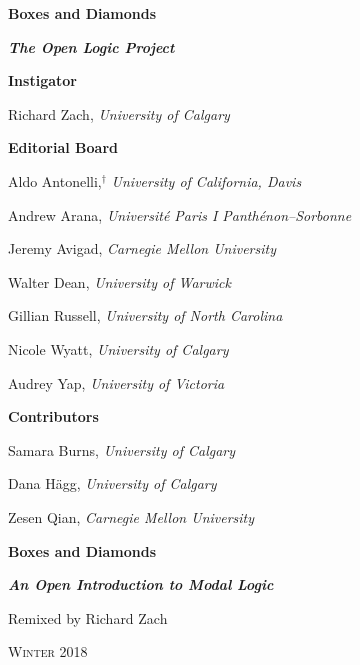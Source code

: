 

\pagestyle{empty}

\vspace*{100pt}

\begin{raggedleft}

{\fontsize{24pt}{24pt}\selectfont\bfseries\sffamily%
Boxes and Diamonds}

\end{raggedleft}


\newpage


\vspace*{100pt}

{\bfseries\itshape The Open Logic Project}

\bigskip

\textbf{\color{leadbeater}Instigator}

\medskip

Richard Zach, \emph{University of Calgary}

\bigskip

\textbf{\color{leadbeater}Editorial Board}

\medskip

Aldo Antonelli,$^\dagger$ \emph{University of California, Davis}

Andrew Arana, \emph{Universit\'e Paris I Panth\'enon--Sorbonne}

Jeremy Avigad, \emph{Carnegie Mellon University}

Walter Dean, \emph{University of Warwick}

Gillian Russell, \emph{University of North Carolina}

Nicole Wyatt, \emph{University of Calgary}

Audrey Yap, \emph{University of Victoria}

\bigskip

\textbf{\color{leadbeater}Contributors}

\medskip

Samara Burns, \emph{University of Calgary}

Dana H\"agg, \emph{University of Calgary}

Zesen Qian, \emph{Carnegie Mellon University}

\newpage


\vspace*{100pt}

\begin{raggedleft}

{\fontsize{24pt}{24pt}\selectfont\bfseries\sffamily%
Boxes and Diamonds}

\bigskip

{\fontsize{18pt}{18pt}\selectfont\bfseries\itshape An Open Introduction to Modal Logic}

\vspace{100pt}

\fontsize{14pt}{14pt}\selectfont Remixed by Richard Zach

\vfill

\textsc{Winter 2018}

\end{raggedleft}


